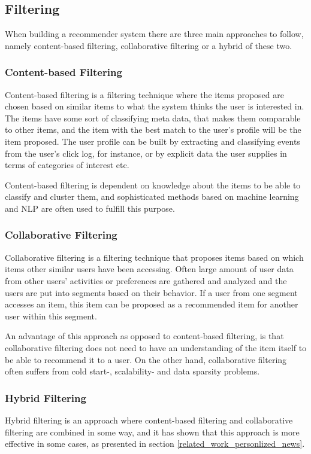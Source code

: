 \subsection{Filtering}
When building a recommender system there are three main approaches to follow, namely content-based filtering, collaborative filtering or a hybrid of these two. 

\subsubsection{Content-based Filtering}
Content-based filtering is a filtering technique where the items proposed are chosen based on similar items to what the system thinks the user is interested in. The items have some sort of classifying meta data, that makes them comparable to other items, and the item with the best match to the user's profile will be the item proposed. The user profile can be built by extracting and classifying events from the user's click log, for instance, or by explicit data the user supplies in terms of categories of interest etc.

Content-based filtering is dependent on knowledge about the items to be able to classify and cluster them, and sophisticated methods based on machine learning and NLP are often used to fulfill this purpose. 


\subsubsection{Collaborative Filtering}
Collaborative filtering is a filtering technique that proposes items based on which items other similar users have been accessing. Often large amount of user data from other users' activities or preferences are gathered and analyzed and the users are put into segments based on their behavior. If a user from one segment accesses an item, this item can be proposed as a recommended item for another user within this segment.

An advantage of this approach as opposed to content-based filtering, is that collaborative filtering does not need to have an understanding of the item itself to be able to recommend it to a user. On the other hand, collaborative filtering often suffers from cold start\cite{lam2008addressing}-, scalability- and data sparsity\cite{huang2004applying} problems.

\subsubsection{Hybrid Filtering}
Hybrid filtering is an approach where content-based filtering and collaborative filtering are combined in some way, and it has shown that this approach is more effective in some cases, as presented in section \ref{related_work_personlized_news}.

